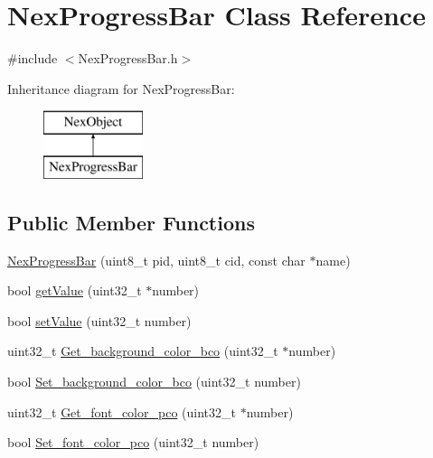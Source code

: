 \hypertarget{class_nex_progress_bar}{\section{Nex\+Progress\+Bar Class Reference}
\label{class_nex_progress_bar}
}


{\ttfamily \#include $<$Nex\+Progress\+Bar.\+h$>$}

Inheritance diagram for Nex\+Progress\+Bar\+:\begin{figure}[H]
\begin{center}
\leavevmode
\includegraphics[height=2.000000cm]{class_nex_progress_bar}
\end{center}
\end{figure}
\subsection*{Public Member Functions}
\begin{DoxyCompactItemize}
\item 
\hyperlink{class_nex_progress_bar_a61f76f0c855c7839630dbc930e3401d8}{Nex\+Progress\+Bar} (uint8\+\_\+t pid, uint8\+\_\+t cid, const char $\ast$name)
\item 
bool \hyperlink{class_nex_progress_bar_a3e5eb13b2aa014c8f6a9e16439917bf2}{get\+Value} (uint32\+\_\+t $\ast$number)
\item 
bool \hyperlink{class_nex_progress_bar_aaa7937d364cb63151bd1e1bc4729334d}{set\+Value} (uint32\+\_\+t number)
\item 
uint32\+\_\+t \hyperlink{class_nex_progress_bar_a2efc0d6694d8739fb9caa31c53190271}{Get\+\_\+background\+\_\+color\+\_\+bco} (uint32\+\_\+t $\ast$number)
\item 
bool \hyperlink{class_nex_progress_bar_ab0b4230a6559989080e2a7b66b42ffc1}{Set\+\_\+background\+\_\+color\+\_\+bco} (uint32\+\_\+t number)
\item 
uint32\+\_\+t \hyperlink{class_nex_progress_bar_aa148721b86c5f56c6321780da3ef974f}{Get\+\_\+font\+\_\+color\+\_\+pco} (uint32\+\_\+t $\ast$number)
\item 
bool \hyperlink{class_nex_progress_bar_a0ee8478a28a3c31d4b7179317299f711}{Set\+\_\+font\+\_\+color\+\_\+pco} (uint32\+\_\+t number)
\end{DoxyCompactItemize}
